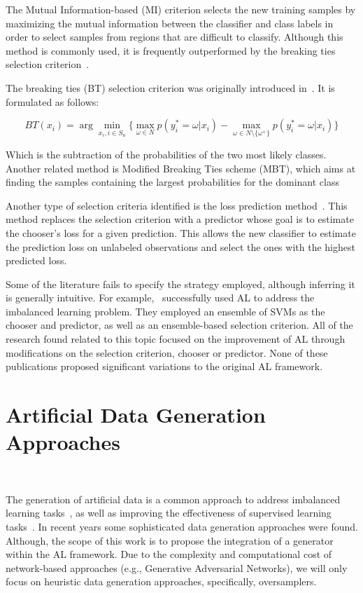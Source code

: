 \documentclass[parskip=full]{scrartcl}
\begin{document}
The Mutual Information-based (MI) criterion selects the new training samples by
maximizing the mutual information between the classifier and class labels in
order to select samples from regions that are difficult to classify. Although
this method is commonly used, it is frequently outperformed by the breaking
ties selection criterion~\cite{Li2011,Liu2018}.

The breaking ties (BT) selection criterion was originally introduced
in~\cite{Luo2003}. It is formulated as follows:

\begin{equation}\label{eq:breaking_ties}
    BT(x_i) = \arg \min_{x_i, i \in S_u}\{ \max_{\omega \in N}{p(y_{i}^{*}=\omega|x_i)} -
    \max_{\omega \in N\setminus\{\omega^{+}\}}{p(y_{i}^{*}=\omega|x_i)}\}
\end{equation}

Which is the subtraction of the probabilities of the two most likely classes.
Another related method is Modified Breaking Ties scheme (MBT), which aims at
finding the samples containing the largest probabilities for the dominant
class~\cite{Liu2018,Li2013a}

Another type of selection criteria identified is the loss prediction
method~\cite{Yoo2019}. This method replaces the selection criterion with a
predictor whose goal is to estimate the chooser's loss for a given
prediction. This allows the new classifier to estimate the prediction loss on
unlabeled observations and select the ones with the highest predicted loss.

Some of the literature fails to specify the strategy employed, although
inferring it is generally intuitive. For example,~\cite{Ertekin2007}
successfully used AL to address the imbalanced learning problem. They employed
an ensemble of SVMs as the chooser and predictor, as well as an ensemble-based
selection criterion. All of the research found related to this topic focused on
the improvement of AL through modifications on the selection criterion, chooser
or predictor. None of these publications proposed significant variations to the
original AL framework.

\section{Artificial Data Generation Approaches}~\label{sec:ovs-sota}

The generation of artificial data is a common approach to address imbalanced
learning tasks~\cite{Kaur2019}, as well as improving the effectiveness of
supervised learning tasks~\cite{DeVries2017}. In recent years some
sophisticated data generation approaches were found.  Although, the scope of
this work is to propose the integration of a generator within the AL framework.
Due to the complexity and computational cost of network-based approaches (e.g.,
Generative Adversarial Networks), we will only focus on heuristic data
generation approaches, specifically, oversamplers.
\end{document}
